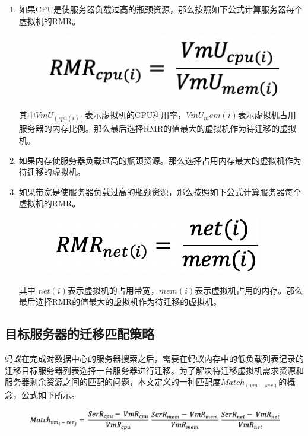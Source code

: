 \begin{enumerate}
    \item 如果CPU是使服务器负载过高的瓶颈资源，那么按照如下公式计算服务器每个虚拟机的RMR。

     \begin{figure}[ht]
      \centering
      \includegraphics{./Figure/IMG_Chap3_12.png}
      \caption{}\label{Fig:chap3_12}
    \end{figure}

      其中$ VmU_(cpu(i)) $表示虚拟机的CPU利用率，$VmU_mem(i) $表示虚拟机占用服务器的内存比例。那么最后选择RMR的值最大的虚拟机作为待迁移的虚拟机。
    \item 如果内存使服务器负载过高的瓶颈资源。那么选择占用内存最大的虚拟机作为待迁移的虚拟机。
    \item 如果带宽是使服务器负载过高的瓶颈资源，那么按照如下公式计算服务器每个虚拟机的RMR。

    \begin{figure}[ht]
      \centering
      \includegraphics{./Figure/IMG_Chap3_13.png}
      \caption{}\label{Fig:chap3_13}
    \end{figure}

    其中 $net(i) $表示虚拟机的占用带宽，$mem(i) $表示虚拟机占用的内存。那么最后选择RMR的值最大的虚拟机作为待迁移的虚拟机。
\end{enumerate}

\subsection{目标服务器的迁移匹配策略}
蚂蚁在完成对数据中心的服务器搜索之后，需要在蚂蚁内存中的低负载列表记录的迁移目标服务器列表选择一台服务器进行迁移。为了解决待迁移虚拟机需求资源和服务器剩余资源之间的匹配的问题，本文定义的一种匹配度$ Match_(vm-ser) $的概念，公式如下所示。

\begin{figure}[ht]
  \centering
  \includegraphics{./Figure/IMG_Chap3_14.png}
  \caption{}\label{Fig:chap3_14}
\end{figure}

